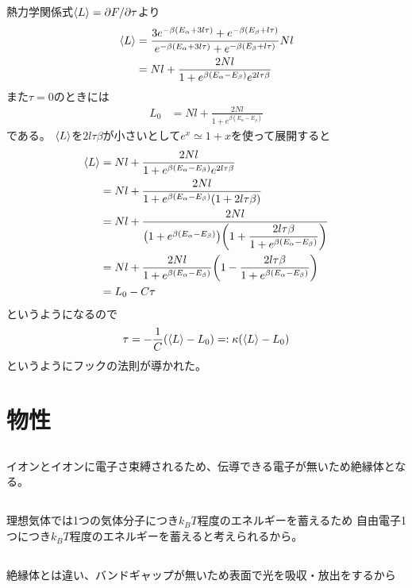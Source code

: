 \documentclass[../../master.tex]{subfiles}
\begin{document}
\section{}
熱力学関係式\(\ev{L}=\partial F/\partial \tau\)より
\begin{align}
    \ev{L} &= \frac{3e^{-\beta(E_\alpha+3l\tau)}+e^{-\beta(E_\beta+l\tau)}}{e^{-\beta(E_\alpha+3l\tau)}+e^{-\beta(E_\beta+l\tau)}}Nl\\
    &=Nl+\frac{2Nl}{1+e^{\beta(E_\alpha-E_\beta)}e^{2l\tau\beta}}
\end{align}
また\(\tau=0\)のときには
\begin{align}
    L_0 &=Nl+\frac{2Nl}{1+e^{\beta(E_\alpha-E_\beta)}}
\end{align}
である。
\(\ev{L}\)を\(2l\tau\beta\)が小さいとして\(e^x \simeq 1+x\)を使って展開すると
\begin{align}
    \ev{L} &=Nl+\frac{2Nl}{1+e^{\beta(E_\alpha-E_\beta)}e^{2l\tau\beta}}\\
    &=Nl+\frac{2Nl}{1+e^{\beta(E_\alpha-E_\beta)}(1+2l\tau\beta)}\\
    &=Nl+\dfrac{2Nl}{\qty(1+e^{\beta(E_\alpha-E_\beta)})\qty(1+\dfrac{2l\tau\beta}{1+e^{\beta(E_\alpha-E_\beta)}})}\\
    &=Nl+\dfrac{2Nl}{1+e^{\beta(E_\alpha-E_\beta)}}\qty(1-\dfrac{2l\tau\beta}{1+e^{\beta(E_\alpha-E_\beta)}})\\
    &= L_0 - C\tau
\end{align}
というようになるので
\begin{align}
    \tau = -\frac{1}{C}(\ev{L}-L_0) =: \kappa(\ev{L}-L_0)
\end{align}
というようにフックの法則が導かれた。

\chapter{物性}
\section{}
イオンとイオンに電子さ束縛されるため、伝導できる電子が無いため絶縁体となる。
\section{}
理想気体では1つの気体分子につき\(k_BT\)程度のエネルギーを蓄えるため
自由電子1つにつき\(k_BT\)程度のエネルギーを蓄えると考えられるから。
\section{}
絶縁体とは違い、バンドギャップが無いため表面で光を吸収・放出をするから
\end{document}
